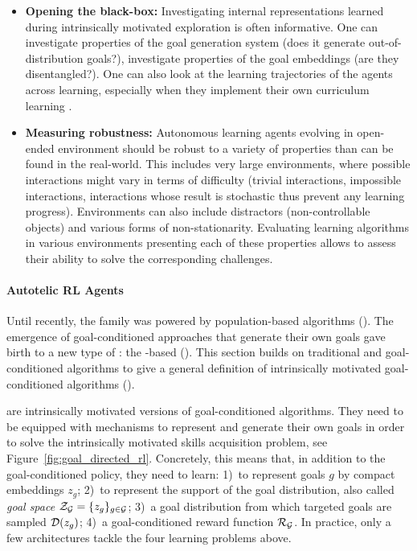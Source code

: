 \begin{itemize}
    \item \textbf{Opening the black-box:} Investigating internal representations learned during intrinsically motivated exploration is often informative. One can investigate properties of the goal generation system (\eg does it generate out-of-distribution goals?), investigate properties of the goal embeddings (\eg are they disentangled?). One can also look at the learning trajectories of the agents across learning, especially when they implement their own curriculum learning \citep{goalgan,curious,blaes2019control,pong2019skew,akakzia2020decstr}.
    \item \textbf{Measuring robustness:} Autonomous learning agents evolving in open-ended environment should be robust to a variety of properties than can be found in the real-world. This includes very large environments, where possible interactions might vary in terms of difficulty (trivial interactions, impossible interactions, interactions whose result is stochastic thus prevent any learning progress). Environments can also include distractors (\eg non-controllable objects) and various forms of non-stationarity. Evaluating learning algorithms in various environments presenting each of these properties allows to assess their ability to solve the corresponding challenges.
\end{itemize}


\paragraph{Autotelic RL Agents}

Until recently, the \imgep family was powered by population-based algorithms (\popimgep). The emergence of goal-conditioned \rl approaches that generate their own goals gave birth to a new type of \imgeps: the \rl-based \imgeps (\rlimgep). This section builds on traditional \rl and goal-conditioned \rl algorithms to give a general definition of intrinsically motivated goal-conditioned \rl algorithms (\rlimgep).

\rlimgep are intrinsically motivated versions of goal-conditioned \rl algorithms. They need to be equipped with mechanisms to represent and generate their own goals in order to solve the intrinsically motivated skills acquisition problem, see Figure~\ref{fig:goal_directed_rl}. Concretely, this means that, in addition to the goal-conditioned policy, they need to learn: 1)~to represent goals $g$ by compact embeddings $z_g$; 2)~to represent the support of the goal distribution, also called \textit{goal space} $\mathcal{Z}_{\mathcal{G}}=\{z_g\}_{g\in\mathcal{G}}$; 3)~a goal distribution from which targeted goals are sampled $\mathcal{D}(z_g)$; 4)~a goal-conditioned reward function $\mathcal{R}_{\mathcal{G}}$. In practice, only a few architectures tackle the four learning problems above. 

